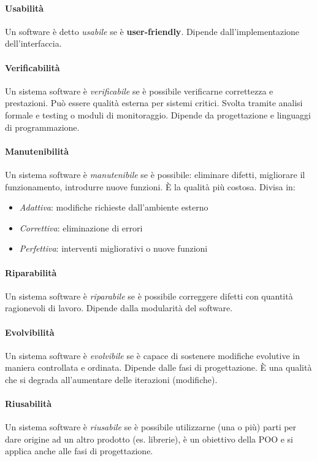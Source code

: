 \paragraph{Usabilità} Un software è detto \textit{usabile} se è \textbf{user-friendly}. Dipende dall'implementazione dell'interfaccia.

\paragraph{Verificabilità} Un sistema software è \textit{verificabile} se è possibile verificarne correttezza e prestazioni. Può essere qualità esterna per sistemi critici. Svolta tramite analisi formale e testing o moduli di monitoraggio. Dipende da progettazione e linguaggi di programmazione.

\paragraph{Manutenibilità} Un sistema software è \textit{manutenibile} se è possibile: eliminare difetti, migliorare il funzionamento, introdurre nuove funzioni. È la qualità più costosa. Divisa in:
\begin{itemize}
    \item \textit{Adattiva}: modifiche richieste dall'ambiente esterno
    \item \textit{Correttiva}: eliminazione di errori
    \item \textit{Perfettiva}: interventi migliorativi o nuove funzioni
\end{itemize}

\paragraph{Riparabilità} Un sistema software è \textit{riparabile} se è possibile correggere difetti con quantità ragionevoli di lavoro. Dipende dalla modularità del software.

\paragraph{Evolvibilità} Un sistema software è \textit{evolvibile} se è capace di sostenere modifiche evolutive in maniera controllata e ordinata. Dipende dalle fasi di progettazione. È una qualità che si degrada all'aumentare delle iterazioni (modifiche).

\paragraph{Riusabilità} Un sistema software è \textit{riusabile} se è possibile utilizzarne (una o più) parti per dare origine ad un altro prodotto (es. librerie), è un obiettivo della POO e si applica anche alle fasi di progettazione.

